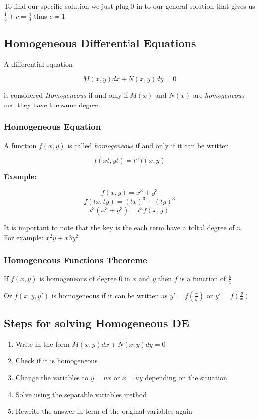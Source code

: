 To find our specific solution we just plug 0 in to our general solution that gives us
\(\frac{1}{3} + c = \frac{4}{3}\) thus \(c = 1\)

\subsection{Homogeneous Differential Equations}

A differential equation 

\[M(x,y)dx + N(x,y)dy = 0\]

is considered \emph{Homogeneous} if and only if
\(M(x)\) and \(N(x)\) are \emph{homogeneous} and they have the same degree.

\subsubsection{Homogeneous Equation}

A function \(f(x,y)\) is called \emph{homogeneous} if and only if it can be written

\[f(xt, yt) = t^n f(x,y)\]

\textbf{Example: }

\[f(x,y) = x^3 + y^3\]
\[f(tx, ty) = (tx)^3 + (ty)^3\]
\[t^3 (x^3 + y^3) = t^3 f(x,y)\]

It is important to note that the key is the each term have a toltal degree of \(n\).
For example: \(x^2y + x3y^2\)

\subsubsection{Homogeneous Functions Theoreme}

If \(f(x,y)\) is homogeneous of degree \(0\) in \(x\) and \(y\) then 
\(f\) is a function of \(\frac{y}{x}\)

Or \(f(x,y,y')\) is homogeneous if it can be written as \(y' = f(\frac{x}{y})\) or \(y' = f(\frac{y}{x})\)

\subsection{Steps for solving Homogeneous DE}

\begin{enumerate}
    \item Write in the form \(M(x,y)dx + N(x,y)dy = 0\)
    \item Check if it is homogeneous
    \item Change the variables to \(y = ux\) or \(x = uy\) depending on the situation
    \item Solve using the separable variables method
    \item Rewrite the answer in term of the original variables again
\end{enumerate}


